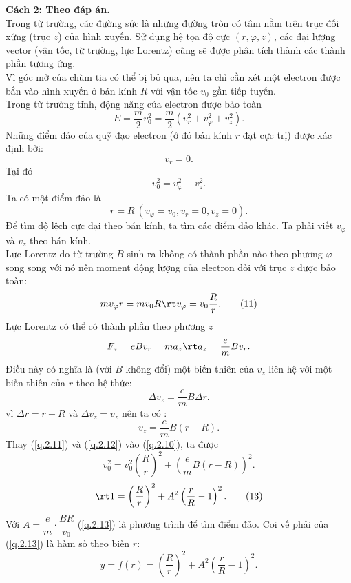 \begin{loigiai}
\begin{enumerate}[1)]
\textbf{Cách 2: Theo đáp án.}\\
Trong từ trường, các đường sức là những đường tròn có tâm nằm trên trục đối xứng (trục $z$) của hình xuyến. Sử dụng hệ tọa độ cực $(r, \varphi, z)$, các đại lượng vector (vận tốc, từ trường, lực Lorentz) cũng sẽ được phân tích thành các thành phần tương ứng.\\
Vì góc mở của chùm tia có thể bị bỏ qua, nên ta chỉ cần xét một electron được bắn vào hình xuyến ở bán kính $R$ với vận tốc $v_0$ gần tiếp tuyến.\\
Trong từ trường tĩnh, động năng của electron được bảo toàn 
\[E = \dfrac{m}{2}v_0^2 = \dfrac{m}{2} \left( v_r^2 + v_\varphi^2 + v_z^2\right).\]
Những điểm đảo của quỹ đạo electron (ở đó bán kính $r$ đạt cực trị) được xác định bởi:
\[v_r = 0.\]
Tại đó 
\[v_0^2 = v_\varphi^2 + v_z^2. \tag{10}\label{q.2.10}\]
Ta có một điểm đảo là 
\[r = R \ (v_\varphi = v_0, v_r = 0, v_z = 0).\]
Để tìm độ lệch cực đại theo bán kính, ta tìm các điểm đảo khác. Ta phải viết $v_\varphi$ và $v_z$ theo bán kính.\\
Lực Lorentz do từ trường $B$ sinh  ra  không có thành phần nào theo phương $\varphi$ song song với nó nên moment động lượng của electron đối với trục $z$ được bảo toàn:
\[mv_\varphi r = mv_0R \rt v_\varphi = v_0 \dfrac{R}{r}. \tag{11}\label{q.2.11}\]
Lực Lorentz có thể có thành phần theo phương $z$
\[{F_z} = {eB} {v_r} = m a_z \rt a_{z} = \dfrac{e}{m} Bv_r. \]
Điều này có nghĩa là (với $B$ không đổi) một biến thiên của $v_z$ liên hệ với một biến thiên của $r$ theo hệ thức:
\[\Delta v_{z} = \dfrac{e}{m} B \Delta r.\]
vì $\Delta r = r - R$ và $\Delta v_{z} = v_{z}$ nên ta có :
\[v_z = \dfrac{e}{m}B (r-R). \tag{12}\label{q.2.12}\]
Thay (\ref{q.2.11}) và (\ref{q.2.12}) vào (\ref{q.2.10}), ta được
\[{v}_{0}^{2}={v}_{0}^{2}\left(\dfrac{{R}}{{r}}\right)^{2}+\left(\dfrac{{e}}{{m}} {B}({r}-{R})\right)^{2}.\]
\[\rt 1 = \left(\dfrac{R}{r}\right)^{2} + A^{2}\left(\dfrac{r }{R} - 1\right)^{2}. \tag{13}\label{q.2.13}\]
Với $A=\dfrac{e}{m}\cdot \dfrac{BR}{v_{0}}$
(\ref{q.2.13}) là phương trình để tìm điểm đảo.
Coi vế phải của (\ref{q.2.13}) là hàm số theo biến $r$:
\[y = f(r) = \left(\dfrac{R}{r}\right)^{2}+A^{2}\left(\dfrac{r}{R} - 1\right)^{2}.\]
\begin{center}
    


\begin{tikzpicture}[x=0.75pt,y=0.75pt,yscale=-1,xscale=1]


\end{tikzpicture}
\end{center}
\end{enumerate}
\end{loigiai}
